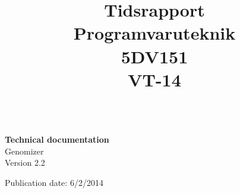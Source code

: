 \title{Tidsrapport \\ 
	Programvaruteknik \\5DV151\\
	VT-14 }
	\begin{titlepage}
		\thispagestyle{empty}
		\begin{large}
			\begin{tabular}{@{}p{\textwidth}@{}}
			\end{tabular}
		\end{large}
		\vspace{35mm}
		\begin{center}
			\Huge{\textbf{Technical documentation}\\ Genomizer} \\
			\vspace{10mm}
			\LARGE{Version 2.2} \\
           \vspace{5mm}
           
            Publication date: 6/2/2014 \\
            

			\vspace{70mm}
            
			\begin{normalsize}				
			\end{normalsize}
		\end{center}
	\end{titlepage}
